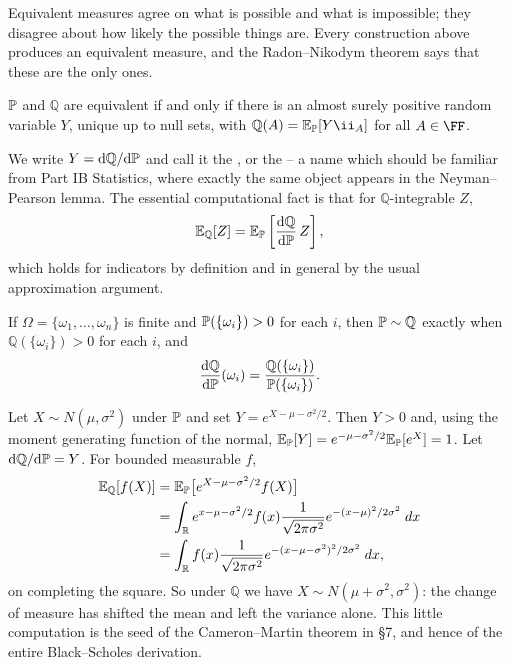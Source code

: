 \documentclass[a4paper]{scrartcl}
\newcommand{\QQ}{\mathbb{Q}}
\newcommand{\dP}{\mathrm{d}\PP}
\newcommand{\dQ}{\mathrm{d}\QQ}
\begin{document}
Equivalent measures agree on what is possible and what is impossible; they disagree about how likely the possible things are. Every construction above produces an equivalent measure, and the Radon--Nikodym theorem says that these are the only ones.

\begin{theorem}
	$\mathbb{P}$ and $\QQ$ are equivalent if and only if there is an almost surely positive random variable $Y$, unique up to null sets, with $\QQ(A) = \EE_\PP[Y \ii_A]$ for all $A \in \FF$.
\end{theorem}

We write $Y = \dQ/\dP$ and call it the , or the  -- a name which should be familiar from Part IB Statistics, where exactly the same object appears in the Neyman--Pearson lemma. The essential computational fact is that for $\QQ$-integrable $Z$,
$$
\EE_\QQ[Z] = \EE_\PP\left[\frac{\dQ}{\dP}\,Z\right],
$$
which holds for indicators by definition and in general by the usual approximation argument.

\begin{example}
	If $\Omega = \{\omega_1, \dots, \omega_n\}$ is finite and $\mathbb{P}(\{\omega_i\}) > 0$ for each $i$, then $\PP \sim \QQ$ exactly when $\QQ(\{\omega_i\}) > 0$ for each $i$, and
	$$
	\frac{\dQ}{\dP}(\omega_i) = \frac{\QQ(\{\omega_i\})}{\PP(\{\omega_i\})}.
	$$
\end{example}

\begin{example}\label{ex:gaussian-tilt}
	Let $X \sim N(\mu, \sigma^2)$ under $\mathbb{P}$ and set $Y = e^{X - \mu - \sigma^2/2}$. Then $Y > 0$ and, using the moment generating function of the normal, $\mathbb{E}_{\mathbb{P}}[Y] = e^{-\mu - \sigma^2/2}\mathbb{E}_{\mathbb{P}}[e^X] = 1$. Let $\dQ/\dP = Y$. For bounded measurable $f$,
	\begin{align*}
		\EE_\QQ[f(X)] &= \EE_\PP\big[e^{X-\mu-\sigma^2/2}f(X)\big]\\
		&= \int_\R e^{x - \mu - \sigma^2/2}f(x)\frac{1}{\sqrt{2\pi\sigma^2}}e^{-(x-\mu)^2/2\sigma^2}\dd x\\
		&= \int_\R f(x)\frac{1}{\sqrt{2\pi\sigma^2}}e^{-(x - \mu - \sigma^2)^2/2\sigma^2}\dd x,
	\end{align*}
	on completing the square. So under $\QQ$ we have $X \sim N(\mu + \sigma^2, \sigma^2)$: the change of measure has shifted the mean and left the variance alone. This little computation is the seed of the Cameron--Martin theorem in \S7, and hence of the entire Black--Scholes derivation.
\end{example}
\end{document}
